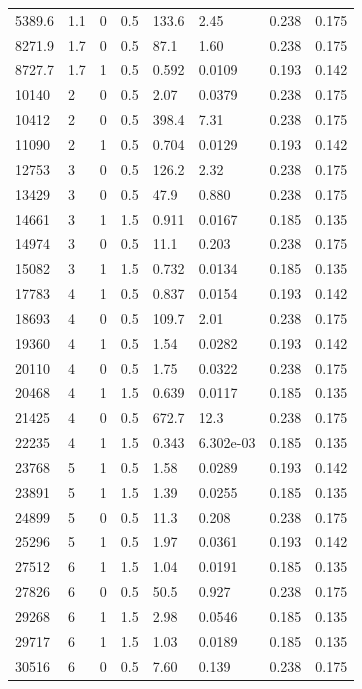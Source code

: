 \documentclass[preview]{standalone}
\begin{document}
{{\begin{tabular}{L{1.2cm}C{1.2cm} C{0.3cm}C{0.5cm} C{1.4cm}C{1.4cm} C{1.4cm}C{1.4cm}}
  5389.6  &   1.1  & 0     & 0.5 &  133.6  & 2.45  & 0.238 &  0.175   \\ 
  8271.9  &   1.7  & 0     & 0.5 &  87.1  & 1.60  & 0.238 &  0.175   \\ 
  8727.7  &   1.7  & 1     & 0.5 &  0.592  & 0.0109  & 0.193 &  0.142   \\ 
  10140  &     2  & 0     & 0.5 &  2.07  & 0.0379  & 0.238 &  0.175   \\ 
  10412  &     2  & 0     & 0.5 &  398.4  & 7.31  & 0.238 &  0.175   \\ 
  11090  &     2  & 1     & 0.5 &  0.704  & 0.0129  & 0.193 &  0.142   \\ 
  12753  &     3  & 0     & 0.5 &  126.2  & 2.32  & 0.238 &  0.175   \\ 
  13429  &     3  & 0     & 0.5 &  47.9  & 0.880  & 0.238 &  0.175   \\ 
  14661  &     3  & 1     & 1.5 &  0.911  & 0.0167  & 0.185 &  0.135   \\ 
  14974  &     3  & 0     & 0.5 &  11.1  & 0.203  & 0.238 &  0.175   \\ 
  15082  &     3  & 1     & 1.5 &  0.732  & 0.0134  & 0.185 &  0.135   \\ 
  17783  &     4  & 1     & 0.5 &  0.837  & 0.0154  & 0.193 &  0.142   \\ 
  18693  &     4  & 0     & 0.5 &  109.7  & 2.01  & 0.238 &  0.175   \\ 
  19360  &     4  & 1     & 0.5 &  1.54  & 0.0282  & 0.193 &  0.142   \\ 
  20110  &     4  & 0     & 0.5 &  1.75  & 0.0322  & 0.238 &  0.175   \\ 
  20468  &     4  & 1     & 1.5 &  0.639  & 0.0117  & 0.185 &  0.135   \\ 
  21425  &     4  & 0     & 0.5 &  672.7  & 12.3  & 0.238 &  0.175   \\ 
  22235  &     4  & 1     & 1.5 &  0.343  & 6.302e-03  & 0.185 &  0.135   \\ 
  23768  &     5  & 1     & 0.5 &  1.58  & 0.0289  & 0.193 &  0.142   \\ 
  23891  &     5  & 1     & 1.5 &  1.39  & 0.0255  & 0.185 &  0.135   \\ 
  24899  &     5  & 0     & 0.5 &  11.3  & 0.208  & 0.238 &  0.175   \\ 
  25296  &     5  & 1     & 0.5 &  1.97  & 0.0361  & 0.193 &  0.142   \\ 
  27512  &     6  & 1     & 1.5 &  1.04  & 0.0191  & 0.185 &  0.135   \\ 
  27826  &     6  & 0     & 0.5 &  50.5  & 0.927  & 0.238 &  0.175   \\ 
  29268  &     6  & 1     & 1.5 &  2.98  & 0.0546  & 0.185 &  0.135   \\ 
  29717  &     6  & 1     & 1.5 &  1.03  & 0.0189  & 0.185 &  0.135   \\ 
  30516  &     6  & 0     & 0.5 &  7.60  & 0.139  & 0.238 &  0.175   \\ 
\hline 
\end{tabular} 

}}
\end{document}
